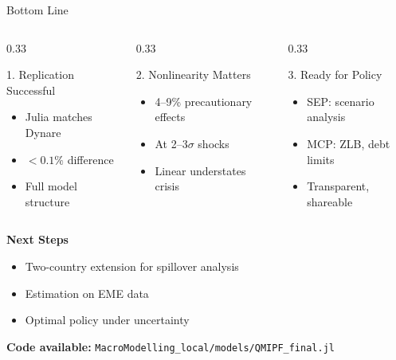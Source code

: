 \documentclass[aspectratio=169,12pt]{beamer}
\begin{document}
\begin{frame}{Bottom Line}

\begin{columns}[T]
\begin{column}{0.33\textwidth}
\begin{block}{1. Replication Successful}
\begin{itemize}
\item Julia matches Dynare
\item $<0.1\%$ difference
\item Full model structure
\end{itemize}
\end{block}
\end{column}

\begin{column}{0.33\textwidth}
\begin{block}{2. Nonlinearity Matters}
\begin{itemize}
\item 4--9\% precautionary effects
\item At 2--3$\sigma$ shocks
\item Linear understates crisis
\end{itemize}
\end{block}
\end{column}

\begin{column}{0.33\textwidth}
\begin{block}{3. Ready for Policy}
\begin{itemize}
\item SEP: scenario analysis
\item MCP: ZLB, debt limits
\item Transparent, shareable
\end{itemize}
\end{block}
\end{column}
\end{columns}

\vspace{0.5cm}
\textbf{Next Steps}
\begin{itemize}
\item Two-country extension for spillover analysis
\item Estimation on EME data
\item Optimal policy under uncertainty
\end{itemize}

\vspace{0.3cm}
\centering
\textbf{Code available:} \texttt{MacroModelling\_local/models/QMIPF\_final.jl}

\end{frame}
\end{document}
